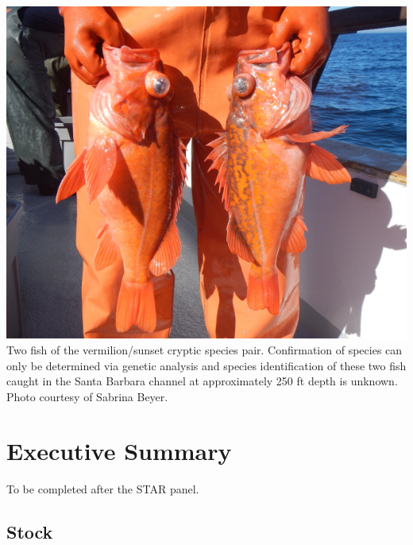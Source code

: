 \documentclass[
  english,
  a4paper,
]{article}
\author{true \and true \and true \and true \and true}
\date{}
\begin{document}
{
\setcounter{tocdepth}{2}
\tableofcontents
}
\newcommand\CapeM{$40^\circ 10^\prime N$}
\newcommand\PtC{$34^\circ 27^\prime N$}
\newcommand\CAOR{$42^\circ 00^\prime N$}

\newpage

\includegraphics{cover_photo.png}
Two fish of the vermilion/sunset cryptic species pair. Confirmation of
species can only be determined via genetic analysis and species identification
of these two fish caught in the Santa Barbara channel at approximately 250 ft depth
is unknown. Photo courtesy of Sabrina Beyer.

\pagebreak
{}
\setcounter{page}{1}

\renewcommand{\thetable}{\roman{table}}
\renewcommand{\thefigure}{\roman{figure}}

\setlength\parskip{0.5em plus 0.1em minus 0.2em}

\hypertarget{executive-summary}{%
\section*{Executive Summary}\label{executive-summary}}

To be completed after the STAR panel.

\hypertarget{stock}{%
\subsection*{Stock}\label{stock}}
\end{document}
